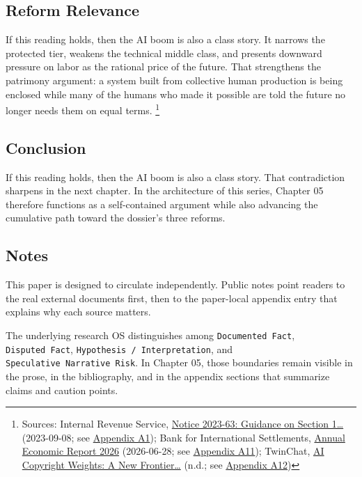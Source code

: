 \documentclass[
  american,
  11pt,
  letterpaper,
]{article}
\begin{document}
\subsection{Reform Relevance}\label{reform-relevance}

If this reading holds, then the AI boom is also a class story. It
narrows the protected tier, weakens the technical middle class, and
presents downward pressure on labor as the rational price of the future.
That strengthens the patrimony argument: a system built from collective
human production is being enclosed while many of the humans who made it
possible are told the future no longer needs them on equal terms.
\footnote{Sources: Internal Revenue Service,
  \href{https://www.irs.gov/pub/irs-drop/n-23-63.pdf}{Notice 2023-63:
  Guidance on Section 1\ldots{}} (2023-09-08; see
  \hyperref[appendix-a1-notice-2023-63-guidance-on-section-174-and-specified-research-or-experimental-expenditures]{Appendix
  A1}); Bank for International Settlements,
  \href{https://www.bis.org/publ/arpdf/ar2026e.pdf}{Annual Economic
  Report 2026} (2026-06-28; see
  \hyperref[appendix-a11-annual-economic-report-2026]{Appendix A11});
  TwinChat,
  \href{https://medium.com/twinchat/ai-copyright-weights-a-new-frontier-in-intellectual-property-law-d8ee1b6c55ee}{AI
  Copyright Weights: A New Frontier\ldots{}} (n.d.; see
  \hyperref[appendix-a12-ai-copyright-weights-a-new-frontier-in-intellectual-property-law]{Appendix
  A12})}

\subsection{Conclusion}\label{conclusion}

If this reading holds, then the AI boom is also a class story. That
contradiction sharpens in the next chapter. In the architecture of this
series, Chapter 05 therefore functions as a self-contained argument
while also advancing the cumulative path toward the dossier's three
reforms.

\subsection{Notes}\label{notes}

This paper is designed to circulate independently. Public notes point
readers to the real external documents first, then to the paper-local
appendix entry that explains why each source matters.

The underlying research OS distinguishes among
\texttt{Documented\ Fact}, \texttt{Disputed\ Fact},
\texttt{Hypothesis\ /\ Interpretation}, and
\texttt{Speculative\ Narrative\ Risk}. In Chapter 05, those boundaries
remain visible in the prose, in the bibliography, and in the appendix
sections that summarize claims and caution points.
\end{document}
